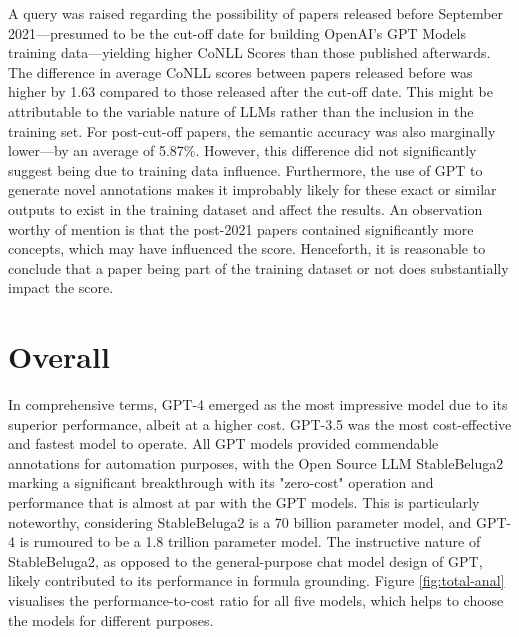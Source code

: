A query was raised regarding the possibility of papers released before September 2021—presumed to be the cut-off date for building OpenAI's GPT Models training data—yielding higher CoNLL Scores than those published afterwards. The difference in average CoNLL scores between papers released before was higher by 1.63 compared to those released after the cut-off date. This might be attributable to the variable nature of LLMs rather than the inclusion in the training set. For post-cut-off papers, the semantic accuracy was also marginally lower—by an average of 5.87\%. However, this difference did not significantly suggest being due to training data influence.
Furthermore, the use of GPT to generate novel annotations makes it improbably likely for these exact or similar outputs to exist in the training dataset and affect the results. An observation worthy of mention is that the post-2021 papers contained significantly more concepts, which may have influenced the score. Henceforth, it is reasonable to conclude that a paper being part of the training dataset or not does substantially impact the score.

\section{Overall}

In comprehensive terms, GPT-4 emerged as the most impressive model due to its superior performance, albeit at a higher cost. GPT-3.5 was the most cost-effective and fastest model to operate. All GPT models provided commendable annotations for automation purposes, with the Open Source LLM StableBeluga2 marking a significant breakthrough with its "zero-cost" operation and performance that is almost at par with the GPT models. This is particularly noteworthy, considering StableBeluga2 is a 70 billion parameter model, and GPT-4 is rumoured to be a 1.8 trillion parameter model. The instructive nature of StableBeluga2, as opposed to the general-purpose chat model design of GPT, likely contributed to its performance in formula grounding. Figure \ref{fig:total-anal} visualises the performance-to-cost ratio for all five models, which helps to choose the models for different purposes.

